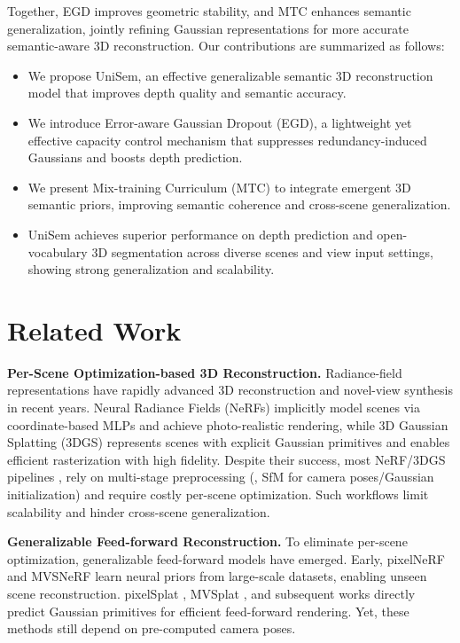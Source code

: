 \documentclass[runningheads]{llncs}
\begin{document}
Together, EGD improves geometric stability, and MTC enhances semantic generalization, jointly refining Gaussian representations for more accurate semantic-aware 3D reconstruction. 
Our contributions are summarized as follows:
\vspace{-6.5mm}
\begin{itemize}
    \item We propose UniSem, an effective generalizable semantic 3D reconstruction model that improves depth quality and semantic accuracy. 
    \item We introduce Error-aware Gaussian Dropout (EGD), a lightweight yet effective capacity control mechanism that suppresses redundancy-induced Gaussians and boosts depth prediction. 
    \item We present Mix-training Curriculum (MTC) to integrate emergent 3D semantic priors, improving semantic coherence and cross-scene generalization.
    \item UniSem achieves superior performance on depth prediction and open-vocabulary 3D segmentation across diverse scenes and view input settings, showing strong generalization and scalability. 
\end{itemize}





\section{Related Work} \label{sec:related}
\textbf{Per-Scene Optimization-based 3D Reconstruction.} 
Radiance-field representations have rapidly advanced 3D reconstruction and novel-view synthesis in recent years.
Neural Radiance Fields (NeRFs) \cite{nerf, nerfreview} implicitly model scenes via coordinate-based MLPs and achieve photo-realistic rendering, while 3D Gaussian Splatting (3DGS) \cite{3dgs, wu2024recent} represents scenes with explicit Gaussian primitives and enables efficient rasterization with high fidelity. 
Despite their success, most NeRF/3DGS pipelines \cite{zipnerf,instantngp,scaffoldgs,mipsplatting,2dgs}, rely on multi-stage preprocessing (\eg, SfM for camera poses/Gaussian initialization) and require costly per-scene optimization.
Such workflows limit scalability and hinder cross-scene generalization.


\noindent
\textbf{Generalizable Feed-forward Reconstruction.}
To eliminate per-scene optimization, generalizable feed-forward models have emerged.
Early, pixelNeRF \cite{pixelnerf} and MVSNeRF \cite{mvsnerf} learn neural priors from large-scale datasets, enabling unseen scene reconstruction. 
pixelSplat \cite{pixelsplat}, MVSplat \cite{mvsplat}, and subsequent works \cite{depthsplat, nam2025generative} directly predict Gaussian primitives for efficient feed-forward rendering. 
Yet, these methods still depend on pre-computed camera poses.
\end{document}
